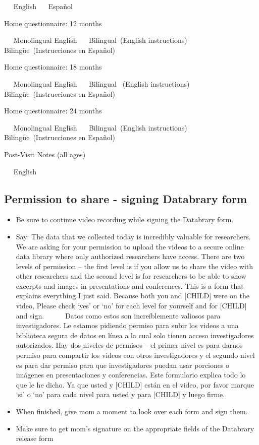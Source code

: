 \documentclass[
  12pt,
]{book}
\providecommand{\tightlist}{%
  \setlength{\itemsep}{0pt}\setlength{\parskip}{0pt}}
\begin{document}
 
{English }
 
{Español}

Home questionnaire: 12 months

 
{Monolingual English }
 
{Bilingual~}{(English instructions)}
 
{Bilingüe~}{(Instrucciones en Español)}

Home questionnaire: 18 months

 
{Monolingual English}
 
{Bilingual ~}{(English instructions)}
 
{Bilingüe~}{(Instrucciones en Español)}

Home questionnaire: 24 months

 
{Monolingual English}
 
{Bilingual~}{(English instructions)}
 
{Bilingüe~}{(Instrucciones en Español)}

Post-Visit Notes (all ages)

 
{English }

\hypertarget{permission-to-share---signing-databrary-form}{%
\subsection*{Permission to share - signing Databrary form}\label{permission-to-share---signing-databrary-form}}

\begin{itemize}
\tightlist
\item
  Be sure to continue video recording while signing the Databrary form.
\item
  Say: The data that we collected today is incredibly valuable for researchers. We are asking for your permission to upload the videos to a secure online data library where only authorized researchers have access. There are two levels of permission -- the first level is if you allow us to share the video with other researchers and the second level is for researchers to be able to show excerpts and images in presentations and conferences. This is a form that explains everything I just said. Because both you and {[}CHILD{]} were on the video, Please check `yes' or `no' for each level for yourself and for {[}CHILD{]} and sign.
      Datos como estos son increíblemente valiosos para investigadores. Le estamos pidiendo permiso para subir los videos a una biblioteca segura de datos en línea a la cual solo tienen acceso investigadores autorizados. Hay dos niveles de permisos -- el primer nivel es para darnos permiso para compartir los videos con otros investigadores y el segundo nivel es para dar permiso para que investigadores puedan usar porciones o imágenes en presentaciones y conferencias. Este formulario explica todo lo que le he dicho. Ya que usted y {[}CHILD{]} están en el video, por favor marque `si' o `no' para cada nivel para usted y para {[}CHILD{]} y luego firme.
\item
  When finished, give mom a moment to look over each form and sign them.
\item
  Make sure to get mom's signature on the appropriate fields of the Databrary release form
\end{itemize}
\end{document}
